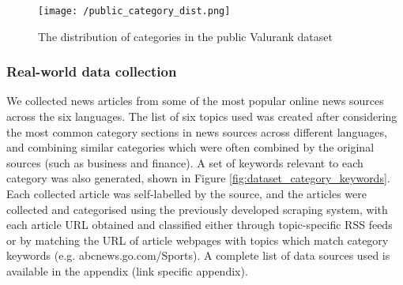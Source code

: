 \documentclass{l4proj}
\begin{document}
\begin{figure}[h]
\texttt{[image: /public\_category\_dist.png]}
\caption{The distribution of categories in the public Valurank dataset}
\label{fig:public_cat_dist}
\end{figure}

\subsubsection{Real-world data collection} \hfill \par
We collected news articles from some of the most popular online news sources across the six languages. The list of six topics used was created after considering the most common category sections in news sources across different languages, and combining similar categories which were often combined by the original sources (such as business and finance). A set of keywords relevant to each category was also generated, shown in Figure \ref{fig:dataset_category_keywords}. Each collected article was self-labelled by the source, and the articles were collected and categorised using the previously developed scraping system, with each article URL obtained and classified either through topic-specific RSS feeds or by matching the URL of article webpages with topics which match category keywords (e.g. abcnews.go.com/Sports). A complete list of data sources used is available in the appendix (link specific appendix). \par
\end{document}
